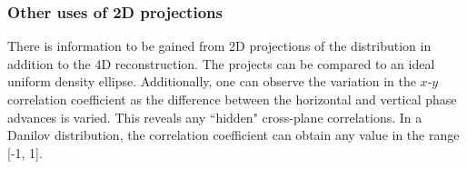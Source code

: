 \subsubsection{Other uses of 2D projections}

There is information to be gained from 2D projections of the distribution in addition to the 4D reconstruction. The projects can be compared to an ideal uniform density ellipse. Additionally, one can observe the variation in the $x$-$y$ correlation coefficient as the difference between the horizontal and vertical phase advances is varied. This reveals any ``hidden" cross-plane correlations. In a Danilov distribution, the correlation coefficient can obtain any value in the range [-1, 1].
